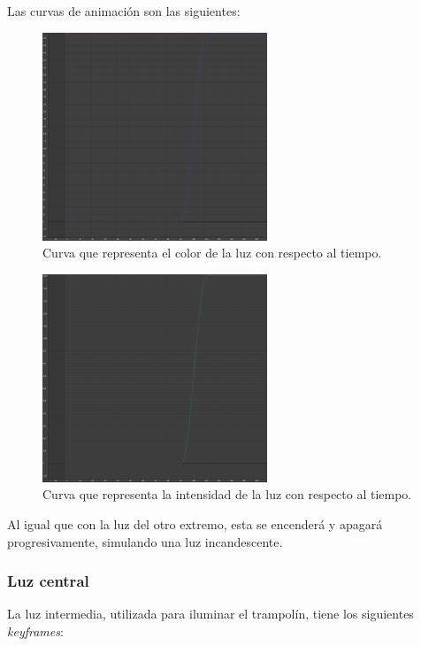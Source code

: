 \documentclass{article}
\begin{document}
 \bigskip

Las curvas de animación son las siguientes:

\begin{figure}[H]
    \centering
    \includegraphics[width=0.6\textwidth]{imagenes/curvas/LR/filter.png}
    \caption{Curva que representa el color de la luz con respecto al tiempo.}
 \end{figure}

 \begin{figure}[H]
    \centering
    \includegraphics[width=0.6\textwidth]{imagenes/curvas/LR/intensity.png}
    \caption{Curva que representa la intensidad de la luz con respecto al tiempo.}
 \end{figure}

Al igual que con la luz del otro extremo, esta se encenderá y apagará progresivamente, simulando una luz incandescente.


\subsubsection{Luz central}

La luz intermedia, utilizada para iluminar el trampolín, tiene los siguientes \textit{keyframes}:
\end{document}
